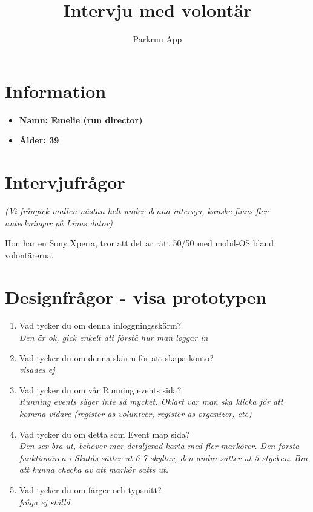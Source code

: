 \documentclass{article}
\title{\textbf{Intervju med volontär}}
\author{Parkrun App}
\date{}
\begin{document}
\maketitle
\thispagestyle{empty}
\section*{Information}
\begin{itemize}[label=]
    \item \textbf{Namn: Emelie (run director)} 
    \item \textbf{Ålder: 39} 
\end{itemize}

\section*{Intervjufrågor}
\textit{(Vi frångick mallen nästan helt under denna intervju, kanske finns fler anteckningar på Linas dator)}

Hon har en Sony Xperia, tror att det är rätt 50/50 med mobil-OS bland volontärerna.


\newpage
\section*{Designfrågor - visa prototypen}
\begin{enumerate}[label=\textbf{Fråga \arabic*:}]
    \item Vad tycker du om denna inloggningsskärm?\\
        \textit{Den är ok, gick enkelt att förstå hur man loggar in}
    \item Vad tycker du om denna skärm för att skapa konto?\\
        \textit{visades ej}
    \item Vad tycker du om vår Running events sida?\\
        \textit{Running events säger inte så mycket. Oklart var man ska klicka för att komma vidare (register as volunteer, register as organizer, etc)}
    \item Vad tycker du om detta som Event map sida?\\
        \textit{Den ser bra ut, behöver mer detaljerad karta med fler markörer. Den första funktionären i Skatås sätter ut 6-7 skyltar, den andra sätter ut 5 stycken. Bra att kunna checka av att markör satts ut.}
    \item Vad tycker du om färger och typsnitt?\\
        \textit{fråga ej ställd}
\end{enumerate}
\end{document}
